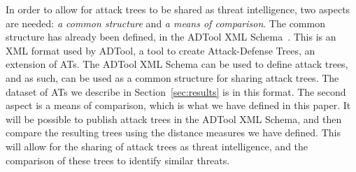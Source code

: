 In order to allow for attack trees to be shared as threat intelligence, two aspects are needed: \emph{a common structure} and \emph{a means of comparison}. The common structure has already been defined, in the ADTool XML Schema~\cite{kordy_adtool_2013}. This is an XML format used by ADTool, a tool to create Attack-Defense Trees, an extension of ATs. The ADTool XML Schema can be used to define attack trees, and as such, can be used as a common structure for sharing attack trees. The dataset of ATs we describe in Section~\ref{sec:results} is in this format. The second aspect is a means of comparison, which is what we have defined in this paper. It will be possible to publish attack trees in the ADTool XML Schema, and then compare the resulting trees using the distance measures we have defined. This will allow for the sharing of attack trees as threat intelligence, and the comparison of these trees to identify similar threats.



